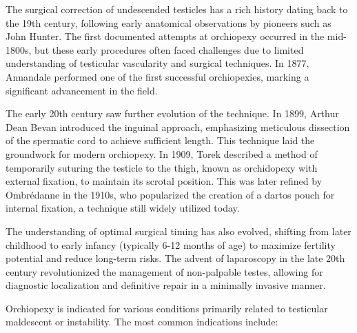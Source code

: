 The surgical correction of undescended testicles has a rich history dating back to the 19th century, following early anatomical observations by pioneers such as John Hunter. The first documented attempts at orchiopexy occurred in the mid-1800s, but these early procedures often faced challenges due to limited understanding of testicular vascularity and surgical techniques. In 1877, Annandale performed one of the first successful orchiopexies, marking a significant advancement in the field.

The early 20th century saw further evolution of the technique. In 1899, Arthur Dean Bevan introduced the inguinal approach, emphasizing meticulous dissection of the spermatic cord to achieve sufficient length. This technique laid the groundwork for modern orchiopexy. In 1909, Torek described a method of temporarily suturing the testicle to the thigh, known as orchidopexy with external fixation, to maintain its scrotal position. This was later refined by Ombr\'edanne in the 1910s, who popularized the creation of a dartos pouch for internal fixation, a technique still widely utilized today. 

The understanding of optimal surgical timing has also evolved, shifting from later childhood to early infancy (typically 6-12 months of age) to maximize fertility potential and reduce long-term risks. The advent of laparoscopy in the late 20th century revolutionized the management of non-palpable testes, allowing for diagnostic localization and definitive repair in a minimally invasive manner.

Orchiopexy is indicated for various conditions primarily related to testicular maldescent or instability. The most common indications include:

